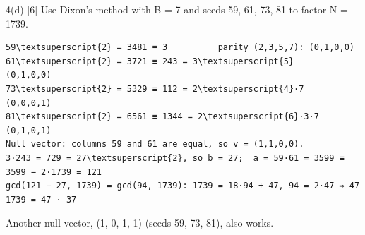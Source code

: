 \documentclass[11pt,a4paper]{article}
\begin{document}
\begin{question}{4(d) \hfill\textnormal{\small [6]}}
Use Dixon's method with B = 7 and seeds 59, 61, 73, 81 to factor N = 1739.\par
\end{question}
\begin{answer}
\begin{workbox}
\begin{Verbatim}[commandchars=\\\{\},fontsize=\footnotesize]
59\textsuperscript{2} = 3481 ≡ 3          parity (2,3,5,7): (0,1,0,0)
61\textsuperscript{2} = 3721 ≡ 243 = 3\textsuperscript{5}     (0,1,0,0)
73\textsuperscript{2} = 5329 ≡ 112 = 2\textsuperscript{4}·7   (0,0,0,1)
81\textsuperscript{2} = 6561 ≡ 1344 = 2\textsuperscript{6}·3·7 (0,1,0,1)
Null vector: columns 59 and 61 are equal, so v = (1,1,0,0).
3·243 = 729 = 27\textsuperscript{2}, so b = 27;  a = 59·61 = 3599 ≡ 3599 − 2·1739 = 121
gcd(121 − 27, 1739) = gcd(94, 1739): 1739 = 18·94 + 47, 94 = 2·47 ⇒ 47
1739 = 47 · 37
\end{Verbatim}
\end{workbox}
{\small\color{black!70} Another null vector, (1, 0, 1, 1) (seeds 59, 73, 81), also works.}\par
\end{answer}
\end{document}
